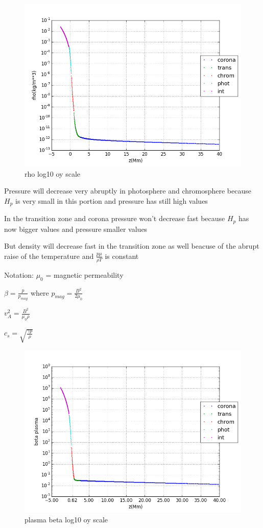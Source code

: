 \documentclass[10pt]{book}
\begin{document}
\begin{figure}[H]
 \centering
 \includegraphics[scale=0.5]{fromFileLogScale2.png}
 \caption{rho log10 oy scale}
\end{figure}

Pressure will decrease very abruptly in photosphere and chromosphere because $H_p$ is very small in this portion and pressure has still high values

In the transition zone and corona  pressure won't decrease fast because $H_p$ has now bigger values and pressure smaller values

But density will decrease fast in the transition zone as well beacuse of the abrupt raise of the temperature and $\frac{p \mu}{\rho T}$ is constant

Notation: $\mu_0$ = magnetic permeability 

$\beta = \frac{p}{p_{mag}}$ where $p_{mag} = \frac{B^2}{2 \mu_0}$

$v_A^2 = \frac{B ^2 }{ \mu_0 \rho} $

$c_s = \sqrt{\frac{\gamma p}{ \rho}} $

\begin{figure}[H]
 \centering
 \includegraphics[scale=0.5]{fromFileLogScale3.png}
 \caption{plasma beta log10 oy scale}
\end{figure}
\end{document}
